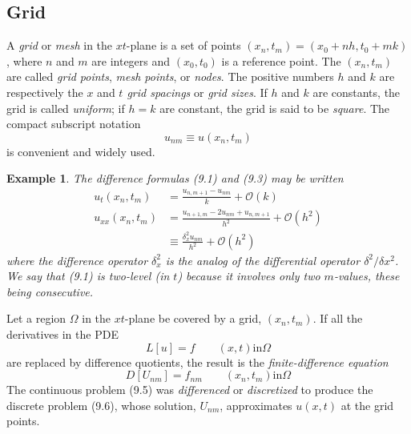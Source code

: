 \documentclass[11pt]{book}
\theoremstyle{example}
\newtheorem{example}{Example}[chapter]
\theoremstyle{problem}
\theoremstyle{theorem}
\theoremstyle{definition}
\begin{document}
\subsection{Grid}
A \emph{grid} or \emph{mesh} in the $xt$-plane is a set of points $(x_n,t_m)=(x_0+nh,t_0+mk)$, where $n$ and $m$ are integers and $(x_0,t_0)$ is a reference point. The $(x_n,t_m)$ are called \emph{grid points}, \emph{mesh points}, or \emph{nodes}. The positive numbers $h$ and $k$ are respectively the \emph{$x$} and \emph{$t$ grid spacings} or \emph{grid sizes}. If $h$ and $k$ are constants, the grid is called \emph{uniform}; if $h=k$ are constant, the grid is said to be \emph{square}. The compact subscript notation
\begin{equation*}
	u_{nm}{\equiv}u(x_n,t_m)
\end{equation*}
is convenient and widely used.
\begin{example}
	The difference formulas (9.1) and (9.3) may be written
	\begin{align*}
		u_t(x_n,t_m)&=\frac{u_{n,m+1}-u_{nm}}{k}+\mathcal{O}(k)\\
		u_{xx}(x_n,t_m)&=\frac{u_{n+1,m}-2u_{nm}+u_{n,m+1}}{h^2}+\mathcal{O}(h^2)\\
		&\equiv\frac{\delta_x^2u_{nm}}{h^2}+\mathcal{O}(h^2)
	\end{align*}
	where the \emph{difference operator} $\delta_x^2$ is the analog of the differential operator $\delta^2/{\delta}x^2$. We say that (9.1) is \emph{two-level} (in $t$) because it involves only two $m$-values, these being consecutive.
\end{example}
Let a region $\Omega$ in the $xt$-plane be covered by a grid, $(x_n,t_m)$. If all the derivatives in the PDE
\begin{equation}
	L[u]=f\qquad(x,t)\mathrm{in}\Omega
\end{equation}
are replaced by difference quotients, the result is the \emph{finite-difference equation}
\begin{equation}
	D[U_{nm}]=f_{nm}\qquad(x_n,t_m)\mathrm{in}\Omega
\end{equation}
The continuous problem (9.5) was \emph{differenced} or \emph{discretized} to produce the discrete problem (9.6), whose solution, $U_{nm}$, approximates $u(x,t)$ at the grid points.
\end{document}
